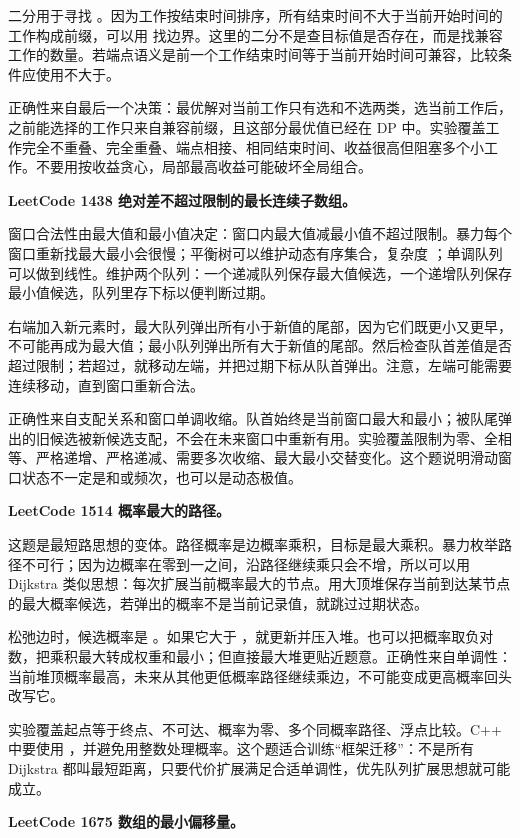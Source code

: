 二分用于寻找 。因为工作按结束时间排序，所有结束时间不大于当前开始时间的工作构成前缀，可以用  找边界。这里的二分不是查目标值是否存在，而是找兼容工作的数量。若端点语义是前一个工作结束时间等于当前开始时间可兼容，比较条件应使用不大于。

正确性来自最后一个决策：最优解对当前工作只有选和不选两类，选当前工作后，之前能选择的工作只来自兼容前缀，且这部分最优值已经在 DP 中。实验覆盖工作完全不重叠、完全重叠、端点相接、相同结束时间、收益很高但阻塞多个小工作。不要用按收益贪心，局部最高收益可能破坏全局组合。

\noindent\textbf{LeetCode 1438 绝对差不超过限制的最长连续子数组。}

窗口合法性由最大值和最小值决定：窗口内最大值减最小值不超过限制。暴力每个窗口重新找最大最小会很慢；平衡树可以维护动态有序集合，复杂度 ；单调队列可以做到线性。维护两个队列：一个递减队列保存最大值候选，一个递增队列保存最小值候选，队列里存下标以便判断过期。

右端加入新元素时，最大队列弹出所有小于新值的尾部，因为它们既更小又更早，不可能再成为最大值；最小队列弹出所有大于新值的尾部。然后检查队首差值是否超过限制；若超过，就移动左端，并把过期下标从队首弹出。注意，左端可能需要连续移动，直到窗口重新合法。

正确性来自支配关系和窗口单调收缩。队首始终是当前窗口最大和最小；被队尾弹出的旧候选被新候选支配，不会在未来窗口中重新有用。实验覆盖限制为零、全相等、严格递增、严格递减、需要多次收缩、最大最小交替变化。这个题说明滑动窗口状态不一定是和或频次，也可以是动态极值。

\noindent\textbf{LeetCode 1514 概率最大的路径。}

这题是最短路思想的变体。路径概率是边概率乘积，目标是最大乘积。暴力枚举路径不可行；因为边概率在零到一之间，沿路径继续乘只会不增，所以可以用 Dijkstra 类似思想：每次扩展当前概率最大的节点。用大顶堆保存当前到达某节点的最大概率候选，若弹出的概率不是当前记录值，就跳过过期状态。

松弛边时，候选概率是 。如果它大于 ，就更新并压入堆。也可以把概率取负对数，把乘积最大转成权重和最小；但直接最大堆更贴近题意。正确性来自单调性：当前堆顶概率最高，未来从其他更低概率路径继续乘边，不可能变成更高概率回头改写它。

实验覆盖起点等于终点、不可达、概率为零、多个同概率路径、浮点比较。C++ 中要使用 ，并避免用整数处理概率。这个题适合训练“框架迁移”：不是所有 Dijkstra 都叫最短距离，只要代价扩展满足合适单调性，优先队列扩展思想就可能成立。

\noindent\textbf{LeetCode 1675 数组的最小偏移量。}

